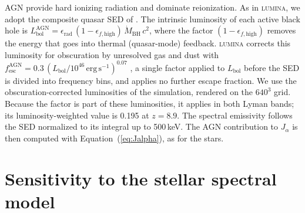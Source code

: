 \documentclass[apj,twocolumn, appendixfloats, twocolappendix, numberedappendix, tighten]{openjournal}
\DeclareRobustCommand{\lumina}{\mbox{\textsc{lumina}}\xspace}
\begin{document}
\begin{appendix}
AGN provide hard ionizing radiation and dominate  reionization. As in \lumina, we adopt the composite quasar SED of \citet{Shen2020}. The intrinsic luminosity of each active black hole is $L^{\mathrm{AGN}}_{\mathrm{bol}} = \epsilon_{\mathrm{rad}}\,(1 - \epsilon_{f,\mathrm{high}})\,\dot{M}_{\mathrm{BH}}\,c^2$, where the factor $(1 - \epsilon_{f,\mathrm{high}})$ removes the energy that goes into thermal (quasar-mode) feedback. \lumina corrects this luminosity for obscuration by unresolved gas and dust with $f_\mathrm{esc}^\mathrm{AGN} = 0.3\,(L_\mathrm{bol}/10^{46}\,\mathrm{erg\,s^{-1}})^{0.07}$ \citep{Hopkins2007, Vogelsberger2013}, a single factor applied to $L_\mathrm{bol}$ before the SED is divided into frequency bins, and applies no further escape fraction. We use the obscuration-corrected luminosities of the simulation, rendered on the $640^3$ grid. Because the factor is part of these luminosities, it applies in both Lyman bands; its luminosity-weighted value is 0.195 at $z = 8.9$. The spectral emissivity follows the SED normalized to its integral up to 500\,keV. The AGN contribution to $J_\alpha$ is then computed with Equation~(\ref{eq:Jalpha}), as for the stars.






\section{Sensitivity to the stellar spectral model} \label{sec:metallicity}



\end{appendix}
\end{document}
